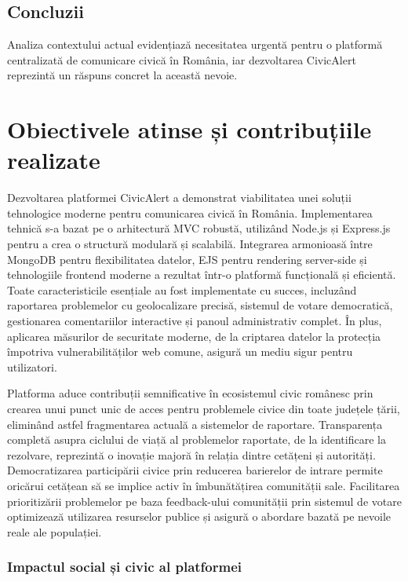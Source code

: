 \documentclass[12pt,a4paper]{report}
\begin{document}
\section{Concluzii}

Analiza contextului actual evidențiază necesitatea urgentă pentru o platformă centralizată de comunicare civică în România, iar dezvoltarea CivicAlert reprezintă un răspuns concret la această nevoie.

\chapter{Obiectivele atinse și contribuțiile realizate}

Dezvoltarea platformei CivicAlert a demonstrat viabilitatea unei soluții tehnologice moderne pentru comunicarea civică în România. Implementarea tehnică s-a bazat pe o arhitectură MVC robustă, utilizând Node.js și Express.js pentru a crea o structură modulară și scalabilă. Integrarea armonioasă între MongoDB pentru flexibilitatea datelor, EJS pentru rendering server-side și tehnologiile frontend moderne a rezultat într-o platformă funcțională și eficientă. Toate caracteristicile esențiale au fost implementate cu succes, incluzând raportarea problemelor cu geolocalizare precisă, sistemul de votare democratică, gestionarea comentariilor interactive și panoul administrativ complet. În plus, aplicarea măsurilor de securitate moderne, de la criptarea datelor la protecția împotriva vulnerabilităților web comune, asigură un mediu sigur pentru utilizatori.

Platforma aduce contribuții semnificative în ecosistemul civic românesc prin crearea unui punct unic de acces pentru problemele civice din toate județele țării, eliminând astfel fragmentarea actuală a sistemelor de raportare. Transparența completă asupra ciclului de viață al problemelor raportate, de la identificare la rezolvare, reprezintă o inovație majoră în relația dintre cetățeni și autorități. Democratizarea participării civice prin reducerea barierelor de intrare permite oricărui cetățean să se implice activ în îmbunătățirea comunității sale. Facilitarea prioritizării problemelor pe baza feedback-ului comunității prin sistemul de votare optimizează utilizarea resurselor publice și asigură o abordare bazată pe nevoile reale ale populației.

\subsection{Impactul social și civic al platformei}
\end{document}
